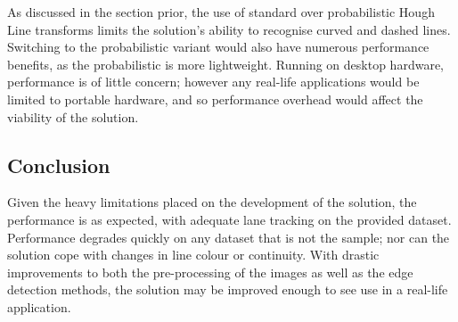 \documentclass[conference]{IEEEtran}
\begin{document}
As discussed in the section prior, the use of standard over probabilistic Hough Line transforms limits the solution's ability to recognise curved and dashed lines. Switching to the probabilistic variant would also have numerous performance benefits, as the probabilistic is more lightweight. Running on desktop hardware, performance is of little concern; however any real-life applications would be limited to portable hardware, and so performance overhead would affect the viability of the solution.

\subsection{Conclusion}
Given the heavy limitations placed on the development of the solution, the performance is as expected, with adequate lane tracking on the provided dataset. Performance degrades quickly on any dataset that is not the sample; nor can the solution cope with changes in line colour or continuity. With drastic improvements to both the pre-processing of the images as well as the edge detection methods, the solution may be improved enough to see use in a real-life application.


%
%

\end{document}
